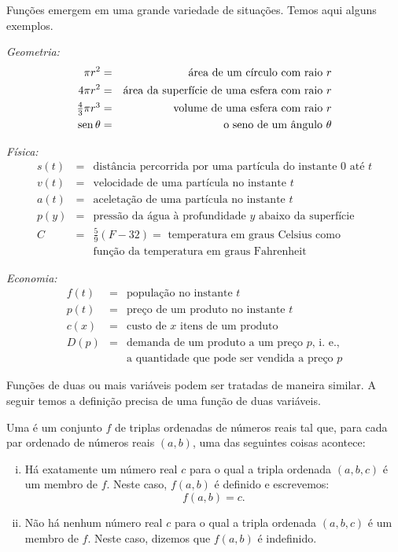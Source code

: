 Funções emergem em uma grande variedade de situações. Temos aqui
alguns exemplos.

\emph{Geometria:}
\begin{eqnarray*}
     \pi r^2 & = & \text{área de um círculo com raio } r \\
   4 \pi r^2 & = & \text{área da superfície de uma esfera com raio } r \\
\textstyle
   \frac{4}{3}\pi r^3 & = & \text{volume de uma esfera com raio } r \\
   \operatorname{sen} \theta & = & \text{o seno de um ângulo } \theta
\end{eqnarray*}

\emph{Física:}
\begin{eqnarray*}
  s(t) & = & \text{distância percorrida por uma partícula do instante } 0 \text{ até } t \\
  v(t) & = & \text{velocidade de uma partícula no instante } t \\
  a(t) & = & \text{aceletação de uma partícula no instante } t \\
  p(y) & = & \text{pressão da água à profundidade } y \text{ abaixo da superfície} \\
     C & = &\textstyle \frac{5}{9}(F - 32) = \text{ temperatura em graus Celsius como}\\
       &   & \text{função da temperatura em graus Fahrenheit}
\end{eqnarray*}

\emph{Economia:}
\begin{eqnarray*}
  f(t) & = & \text{população no instante } t \\
  p(t) & = & \text{preço de um produto no instante } t \\
  c(x) & = & \text{custo de } x \text{ itens de um produto} \\
  D(p) & = & \text{demanda de um produto a um preço } p \text{, i. e.,} \\
       &   & \text{a quantidade que pode ser vendida a preço } p
\end{eqnarray*}

Funções de duas ou mais variáveis podem ser tratadas de maneira
similar. A seguir temos a definição precisa de uma função de
duas variáveis.

\begin{defin}
Uma  é um conjunto $f$ de
triplas ordenadas de números reais tal que, para cada par ordenado
de números reais $(a,b)$, uma das seguintes coisas acontece:
\begin{enumerate}[(i)]
\item Há exatamente um número real $c$ para o qual a tripla
      ordenada $(a,b,c)$ é um membro de $f$. Neste caso, $f(a,b)$
      é definido e escrevemos:
\[
  f(a,b) = c.
\]
\item Não há nenhum número real $c$ para o qual a tripla
      ordenada $(a,b,c)$ é um membro de $f$. Neste caso,
      dizemos que $f(a,b)$ é indefinido.
\end{enumerate}
\end{defin}

